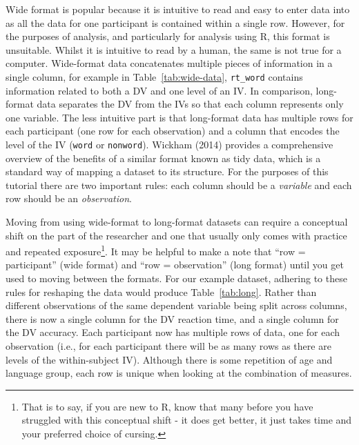 \documentclass[
  english,
  doc,floatsintext]{apa6}
\begin{document}
Wide format is popular because it is intuitive to read and easy to enter data into as all the data for one participant is contained within a single row. However, for the purposes of analysis, and particularly for analysis using R, this format is unsuitable. Whilst it is intuitive to read by a human, the same is not true for a computer. Wide-format data concatenates multiple pieces of information in a single column, for example in Table~\ref{tab:wide-data}, \texttt{rt\_word} contains information related to both a DV and one level of an IV. In comparison, long-format data separates the DV from the IVs so that each column represents only one variable. The less intuitive part is that long-format data has multiple rows for each participant (one row for each observation) and a column that encodes the level of the IV (\texttt{word} or \texttt{nonword}). Wickham (2014) provides a comprehensive overview of the benefits of a similar format known as tidy data, which is a standard way of mapping a dataset to its structure. For the purposes of this tutorial there are two important rules: each column should be a \emph{variable} and each row should be an \emph{observation}.

Moving from using wide-format to long-format datasets can require a conceptual shift on the part of the researcher and one that usually only comes with practice and repeated exposure\footnote{That is to say, if you are new to R, know that many before you have struggled with this conceptual shift - it does get better, it just takes time and your preferred choice of cursing.}. It may be helpful to make a note that ``row = participant'' (wide format) and ``row = observation'' (long format) until you get used to moving between the formats. For our example dataset, adhering to these rules for reshaping the data would produce Table~\ref{tab:long}. Rather than different observations of the same dependent variable being split across columns, there is now a single column for the DV reaction time, and a single column for the DV accuracy. Each participant now has multiple rows of data, one for each observation (i.e., for each participant there will be as many rows as there are levels of the within-subject IV). Although there is some repetition of age and language group, each row is unique when looking at the combination of measures.
\end{document}
